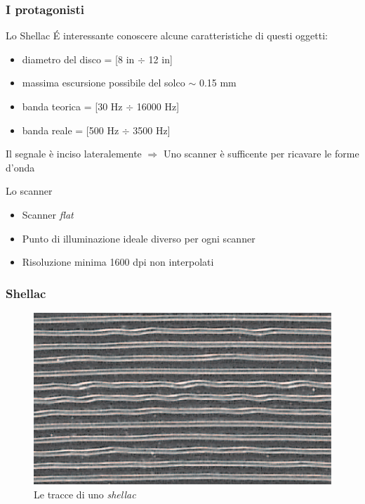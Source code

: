 \begin{frame}

\frametitle{I protagonisti}

\begin{block}{Lo Shellac}
\'E interessante conoscere alcune caratteristiche di questi oggetti:
\begin{itemize}
\item diametro del disco = [8 in $\div$ 12 in]
\item massima escursione possibile del solco $\sim$ 0.15 mm
\item banda teorica = [30 Hz $\div$ 16000 Hz]
\item banda reale = [500 Hz $\div$ 3500 Hz] 
\end{itemize}
Il segnale è inciso lateralemente $\Rightarrow$ Uno scanner è 
sufficente per ricavare le forme d'onda
\end{block}

\begin{block}{Lo scanner}
\begin{itemize}
\item Scanner \emph{flat}
\item Punto di illuminazione ideale diverso per ogni scanner
\item Risoluzione minima 1600 dpi non interpolati
\end{itemize}
\end{block}
\end{frame}

\begin{frame}
\frametitle{Shellac}
\begin{figure}
\includegraphics[width=\textwidth]{immagini/shellac-track.png}
\caption{Le tracce di uno \emph{shellac}}
\end{figure}
\end{frame}


